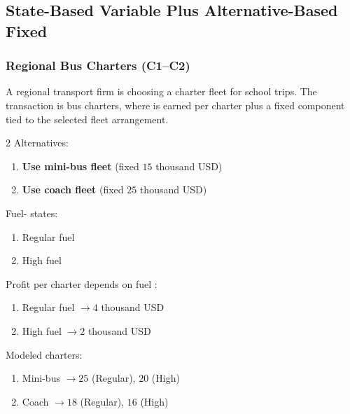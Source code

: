 
	\subsection{State-Based Variable Plus Alternative-Based Fixed}
	\label{sec:state-based-variable-payoff-plus-alternative-based-fixed-payoff}


	\subsubsection{Regional Bus Charters (C1--C2)}
	\label{sec:problem20-regional-bus-charters-c1-c2}
	A regional transport firm is choosing a charter fleet for school trips. The transaction is bus charters, where  is earned per charter plus a fixed  component tied to the selected fleet arrangement.

	\begin{multicols}{2}
		Alternatives:
		\begin{enumerate}[label=\arabic*.]
			\item \textbf{Use mini-bus fleet} (fixed  $15$ thousand USD)
			\item \textbf{Use coach fleet} (fixed  $25$ thousand USD)
		\end{enumerate}

		Fuel- states:
		\begin{enumerate}[label=\arabic*.]
			\item Regular fuel 
			\item High fuel 
		\end{enumerate}

			\columnbreak

		Profit per charter depends on fuel :
		\begin{enumerate}[label=\arabic*.]
			\item Regular fuel $\to 4$ thousand USD
			\item High fuel $\to 2$ thousand USD
		\end{enumerate}

		Modeled charters:
		\begin{enumerate}[label=\arabic*.]
			\item Mini-bus $\to 25$ (Regular), $20$ (High)
			\item Coach $\to 18$ (Regular), $16$ (High)
		\end{enumerate}
	\end{multicols}

